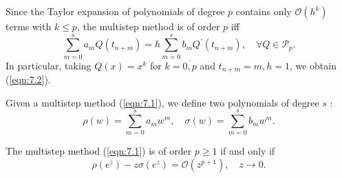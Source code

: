 \documentclass[a4paper]{article}
\begin{document}
\begin{remark}
    Since the Taylor expansion of polynomials of degree $p$ contains only $\mathcal{O}\left(h^k\right)$ terms with $k \leq p$, the multistep method is of order $p$ iff
\[
\sum_{m=0}^s a_m Q\left(t_{n+m}\right)=h \sum_{m=0}^s b_m Q^{\prime}\left(t_{n+m}\right), \quad \forall Q \in \mathcal{P}_p .
\]
In particular, taking $Q(x)=x^k$ for $k=\overline{0,p}$ and $t_{n+m}=m, h=1$, we obtain (\ref{eqn:7.2}).
\end{remark}
Given a multistep method (\ref{eqn:7.1}), we define two polynomials of degree $s$ :
\[
\rho(w)=\sum_{m=0}^s a_m w^m, \quad \sigma(w)=\sum_{m=0}^s b_m w^m .
\]

\begin{theorem}
    The multistep method (\ref{eqn:7.1}) is of order $p \geq 1$ if and only if
\begin{equation}\label{eqn:7.3}
    \rho\left(e^z\right)-z \sigma\left(e^z\right)=\mathcal{O}\left(z^{p+1}\right), \quad z \rightarrow 0.
\end{equation}
\end{theorem}
\end{document}
